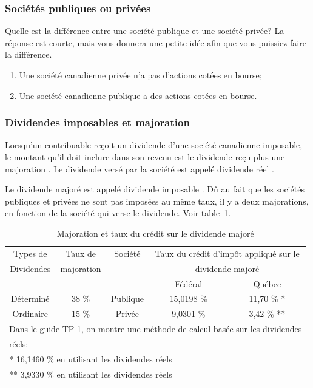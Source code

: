 \subsubsection{Sociétés publiques ou privées}
Quelle est la différence entre une société publique et une société privée?  La réponse est courte, mais vous donnera une petite idée afin que vous puissiez faire la différence.
\begin{enumerate}
	\item Une société canadienne privée n'a pas d'actions cotées en bourse;
	\item Une société canadienne publique a des actions cotées en bourse.
\end{enumerate}

\subsubsection{Dividendes imposables et majoration}
Lorsqu'un contribuable reçoit un dividende d'une société canadienne imposable, le montant qu'il doit inclure dans son revenu est le dividende reçu plus une \og majoration \fg{}. Le dividende versé par la société est appelé \og dividende réel \fg{}.

Le dividende majoré est appelé \og dividende imposable \fg{}. Dû au fait que les sociétés publiques et privées ne sont pas imposées au même taux, il y a deux majorations, en fonction de la société qui verse le dividende. Voir table~\ref{table:MajorationDividende}.
\begin{table}
	\centering
	\begin{tabular}{|c|c|c|c|c|}
		\hline
		 Types de  &  Taux de   & Société  &  \multicolumn{2}{c|}{Taux du crédit d'impôt appliqué sur le}  \\
		Dividendes & majoration &          &             \multicolumn{2}{c|}{dividende majoré}             \\ \cline{4-5}
		           &            &          &  Fédéral   &                      Québec                      \\ \hline
		Déterminé  &   38 \%    & Publique & 15,0198 \% &                    11,70 \% *                    \\ \hline
		Ordinaire  &   15 \%    &  Privée  & 9,0301 \%  &                    3,42 \% **                    \\ \hline\hline
		\multicolumn{5}{|l|}{Dans le guide TP-1, on montre une méthode de calcul basée sur les dividendes} \\
		\multicolumn{5}{|l|}{réels:}                                                                       \\
		\multicolumn{5}{|l|}{* 16,1460 \% en utilisant les dividendes réels}                               \\
		\multicolumn{5}{|l|}{** 3,9330 \% en utilisant les dividendes réels}                               \\ \hline
	\end{tabular}
	\caption{Majoration et taux du crédit sur le dividende majoré}
	\label{table:MajorationDividende}
\end{table}


